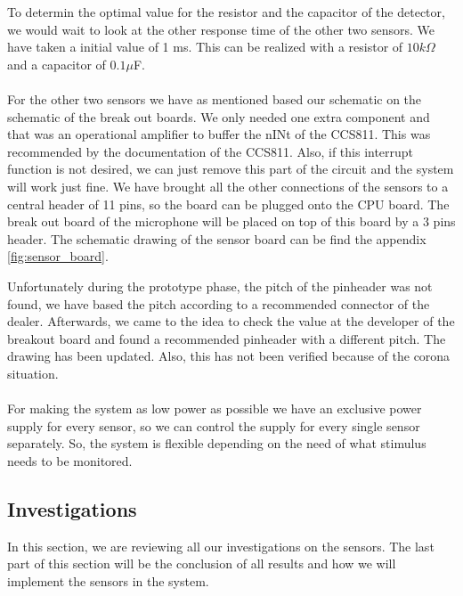 \documentclass[11pt,a4paper]{article}
\begin{document}
To determin the optimal value for the resistor and the capacitor of the detector, we would wait to look at the other response time of the other two sensors. We have taken a initial value of 1 ms. This can be realized with a resistor of $ 10 k\Omega$ and a capacitor of $0.1 \mu$F.
\\ \\
For the other two sensors we have as mentioned based our schematic on the schematic of the break out boards. We only needed one extra component and that was an operational amplifier to buffer the nINt of the CCS811. This was recommended by the documentation of the CCS811. Also, if this interrupt function is not desired, we can just remove this part of the circuit and the system will work just fine. We have brought all the other connections of the sensors to a central header of 11 pins, so the board can be plugged onto the CPU board. The break out board of the microphone will be placed on top of this board by a 3 pins header.  The schematic drawing of the sensor board can be find the appendix \ref{fig:sensor_board}.

Unfortunately during the prototype phase, the pitch of the pinheader was not found, we have based the pitch according to a recommended connector of the dealer. Afterwards, we came to the idea to check the value at the developer of the breakout board and found a recommended pinheader with a different pitch. The drawing has been updated. Also, this has not been verified because of the corona situation.
\\ \\
For making the system as low power as possible we have an exclusive power supply for every sensor, so we can control the supply for every single sensor separately.
So, the system is flexible depending on the need of what stimulus needs to be monitored.

\subsection{Investigations}
In this section, we are reviewing all our investigations on the sensors. The last part of this section will be the conclusion of all results and how we will implement the sensors in the system.
\end{document}
